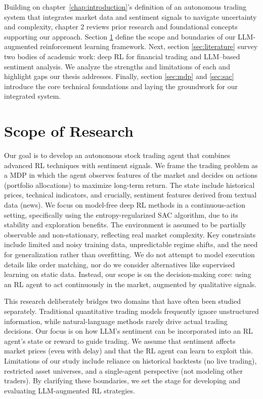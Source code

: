 Building on chapter \ref{chap:introduction}'s definition of an autonomous trading system that integrates market data and sentiment signals to navigate uncertainty and complexity, chapter 2 reviews prior research and foundational concepts supporting our approach. Section \ref{sec:scope} define the scope and boundaries of our \gls{LLM}-augmented reinforcement learning framework.  Next, section \ref{sec:literature} survey two bodies of academic work: deep \gls{RL} for financial trading and \gls{LLM}–based sentiment analysis.  We analyze the strengths and limitations of each and highlight gaps our thesis addresses. Finally, section \ref{sec:mdp} and \ref{sec:sac} introduce the core technical foundations and laying the groundwork for our integrated system.

\section{Scope of Research}
\label{sec:scope}
Our goal is to develop an autonomous stock trading agent that combines advanced \gls{RL} techniques with sentiment signals.  We frame the trading problem as a \gls{MDP} in which the agent observes features of the market and decides on actions (portfolio allocations) to maximize long-term return. The state include historical prices, technical indicators, and crucially, sentiment features derived from textual data (news).  We focus on model-free deep \gls{RL} methods in a continuous-action setting, specifically using the entropy-regularized \gls{SAC} algorithm, due to its stability and exploration benefits.  The environment is assumed to be partially observable and non-stationary, reflecting real market complexity. Key constraints include limited and noisy training data, unpredictable regime shifts, and the need for generalization rather than overfitting.  We do not attempt to model execution details like order matching, nor do we consider alternatives like supervised learning on static data.  Instead, our scope is on the decision-making core: using an RL agent to act continuously in the market, augmented by qualitative signals.

This research deliberately bridges two domains that have often been studied separately.  Traditional quantitative trading models frequently ignore unstructured information, while natural-language methods rarely drive actual trading decisions.  Our focus is on how \gls{LLM}'s sentiment can be incorporated into an \gls{RL} agent's state or reward to guide trading.  We assume that sentiment affects market prices (even with delay) and that the \gls{RL} agent can learn to exploit this. Limitations of our study include reliance on historical backtests (no live trading), restricted asset universes, and a single-agent perspective (not modeling other traders). By clarifying these boundaries, we set the stage for developing and evaluating \gls{LLM}-augmented RL strategies.

